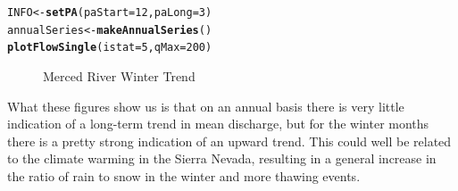 \documentclass[a4paper,11pt]{article}\usepackage[]{graphicx}\usepackage[]{color}
\makeatletter
\newcommand{\hlnum}[1]{\textcolor[rgb]{0.686,0.059,0.569}{#1}}%
\newcommand{\hlstd}[1]{\textcolor[rgb]{0.345,0.345,0.345}{#1}}%
\newcommand{\hlkwb}[1]{\textcolor[rgb]{0.69,0.353,0.396}{#1}}%
\newcommand{\hlkwc}[1]{\textcolor[rgb]{0.333,0.667,0.333}{#1}}%
\newcommand{\hlkwd}[1]{\textcolor[rgb]{0.737,0.353,0.396}{\textbf{#1}}}%
\newenvironment{kframe}{%
 \def\at@end@of@kframe{}%
 \ifinner\ifhmode%
  \def\at@end@of@kframe{\end{minipage}}%
  \begin{minipage}{\columnwidth}%
 \fi\fi%
 \def\FrameCommand##1{\hskip\@totalleftmargin \hskip-\fboxsep
 \colorbox{shadecolor}{##1}\hskip-\fboxsep
     \hskip-\linewidth \hskip-\@totalleftmargin \hskip\columnwidth}%
 \MakeFramed {\advance\hsize-\width
   \@totalleftmargin\z@ \linewidth\hsize
   \@setminipage}}%
 {\par\unskip\endMakeFramed%
 \at@end@of@kframe}
\newenvironment{knitrout}{}{} %
\makeatother
\begin{document}
\begin{knitrout}
\begin{kframe}
\begin{alltt}
\hlstd{INFO}\hlkwb{<-}\hlkwd{setPA}\hlstd{(}\hlkwc{paStart}\hlstd{=}\hlnum{12}\hlstd{,}\hlkwc{paLong}\hlstd{=}\hlnum{3}\hlstd{)}
\hlstd{annualSeries}\hlkwb{<-}\hlkwd{makeAnnualSeries}\hlstd{()}
\hlkwd{plotFlowSingle}\hlstd{(}\hlkwc{istat}\hlstd{=}\hlnum{5}\hlstd{,}\hlkwc{qMax}\hlstd{=}\hlnum{200}\hlstd{)}
\end{alltt}
\end{kframe}\begin{figure}[]
\caption[Merced River Winter Trend]{Merced River Winter Trend\label{fig:Merced}}
\end{figure}


\end{knitrout}


What these figures show us is that on an annual basis there is very little indication of a long-term trend in mean discharge, but for the winter months there is a pretty strong indication of an upward trend.  This could well be related to the climate warming in the Sierra Nevada, resulting in a general increase in the ratio of rain to snow in the winter and more thawing events.
\end{document}
